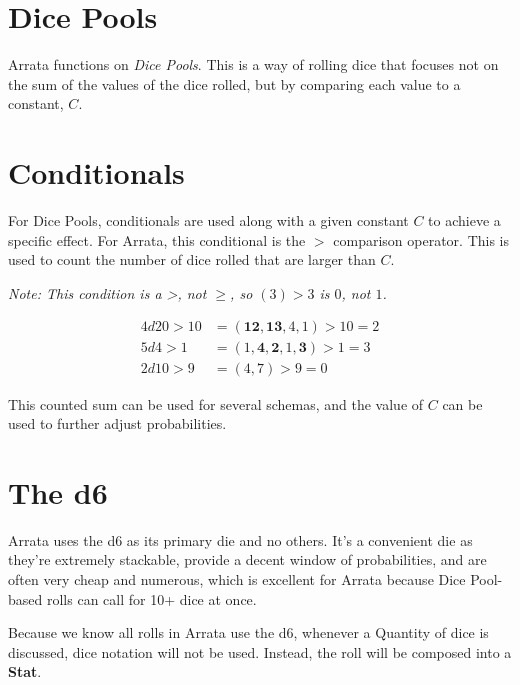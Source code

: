 \documentclass[../main.tex]{subfiles}
\begin{document}
    \section{Dice Pools}

    Arrata functions on {\em Dice Pools}. This is a way of rolling dice that focuses not on the sum of the values of the dice rolled, but by comparing each value to a constant, $C$.

    \section{Conditionals}

    For Dice Pools, conditionals are used along with a given constant $C$ to achieve a specific effect. For Arrata, this conditional is the $>$ comparison operator. This is used to count the number of dice rolled that are larger than $C$.

    \emph{Note: This condition is a >, not $\geq$, so $(3) > 3$ is $0$, not $1$.}
    \begin{mdframed}[style=Arrata]
        \begin{align*}
            4d20>10 & = (\textbf{12}, \textbf{13}, 4, 1)>10 = 2             \\
            5d4>1   & = (1, \textbf{4}, \textbf{2}, 1, \textbf{3})>1 = 3   \\
            2d10>9  & = (4, 7)>9 = 0
        \end{align*}
    \end{mdframed}

    This counted sum can be used for several schemas, and the value of $C$ can be used to further adjust probabilities.

    \section{The d6}

    Arrata uses the d6 as its primary die and no others. It's a convenient die as they're extremely stackable, provide a decent window of probabilities, and are often very cheap and numerous, which is excellent for Arrata because Dice Pool-based rolls can call for 10+ dice at once.

    Because we know all rolls in Arrata use the d6, whenever a Quantity of dice is discussed, dice notation will not be used. Instead, the roll will be composed into a \textbf{Stat}.
\end{document}
